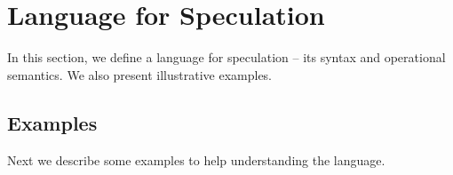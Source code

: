 \section{Language for Speculation}\label{sec:language}

In this section, we define a language for speculation -- its syntax and
operational semantics. We also present illustrative examples.





\subsection{Examples}\label{sec:examples}

Next we describe some examples to help understanding the language.

% 






